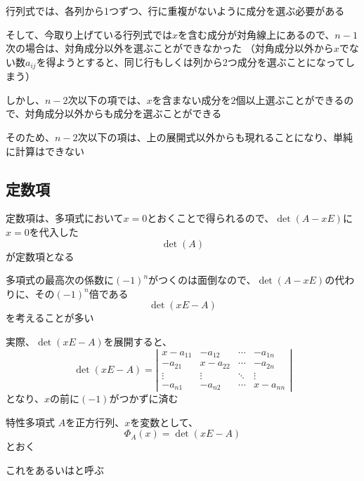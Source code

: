\documentclass[../../../topic_linear-algebra]{subfiles}
\begin{document}
行列式では、各列から1つずつ、行に重複がないように成分を選ぶ必要がある

そして、今取り上げている行列式では$x$を含む成分が対角線上にあるので、$n-1$次の場合は、対角成分以外を選ぶことができなかった
（対角成分以外から$x$でない数$a_{ij}$を得ようとすると、同じ行もしくは列から2つ成分を選ぶことになってしまう）

\br

しかし、$n-2$次以下の項では、$x$を含まない成分を$2$個以上選ぶことができるので、対角成分以外からも成分を選ぶことができる

そのため、$n-2$次以下の項は、上の展開式以外からも現れることになり、単純に計算はできない

\subsection{定数項}

定数項は、多項式において$x=0$とおくことで得られるので、$\det(A - xE)$に$x=0$を代入した
\begin{equation*}
  \det(A)
\end{equation*}
が定数項となる

\sectionline

多項式の最高次の係数に$(-1)^n$がつくのは面倒なので、$\det(A - xE)$の代わりに、その$(-1)^n$倍である
\begin{equation*}
  \det(xE - A)
\end{equation*}
を考えることが多い

\br

実際、$\det(xE - A)$を展開すると、
\begin{equation*}
  \det(xE - A) = \left| \begin{matrix}
    x - a_{11} & -a_{12}    & \cdots & -a_{1n}    \\
    -a_{21}    & x - a_{22} & \cdots & -a_{2n}    \\
    \vdots     & \vdots     & \ddots & \vdots     \\
    -a_{n1}    & -a_{n2}    & \cdots & x - a_{nn}
  \end{matrix} \right|
\end{equation*}
となり、$x$の前に$(-1)$がつかずに済む

\sectionline

\begin{definition}{特性多項式}
  $A$を正方行列、$x$を変数として、
  \begin{equation*}
    \Phi_A(x) = \det(xE - A)
  \end{equation*}
  とおく

  これをあるいはと呼ぶ
\end{definition}
\end{document}
